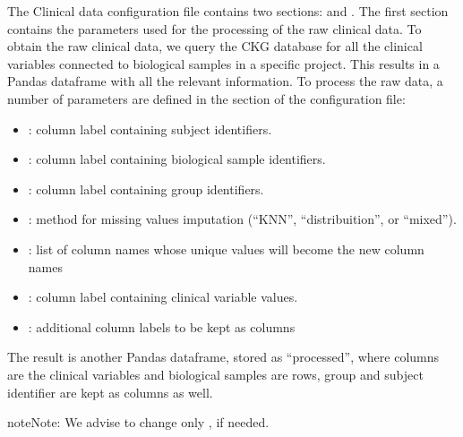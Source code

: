 \documentclass[letterpaper,10pt,english]{sphinxmanual}
\begin{document}
The Clinical data configuration file contains two sections:  and .
The first section contains the parameters used for the processing of the raw clinical data. To obtain the raw clinical data, we query the CKG database for all the clinical variables connected to biological samples in a specific project. This results in a Pandas dataframe with all the relevant information. To process the raw data, a number of parameters are defined in the  section of the configuration file:
\begin{itemize}
\item {} 
: column label containing subject identifiers.

\item {} 
: column label containing biological sample identifiers.

\item {} 
: column label containing group identifiers.

\item {} 
: method for missing values imputation (“KNN”, “distribuition”, or “mixed”).

\item {} 
: list of column names whose unique values will become the new column names

\item {} 
: column label containing clinical variable values.

\item {} 
: additional column labels to be kept as columns

\end{itemize}

The result is another Pandas dataframe, stored as “processed”, where columns are the clinical variables and biological samples are rows, group and subject identifier are kept as columns as well.

\begin{sphinxadmonition}{note}{Note:}
We advise to change only , if needed.
\end{sphinxadmonition}
\end{document}
